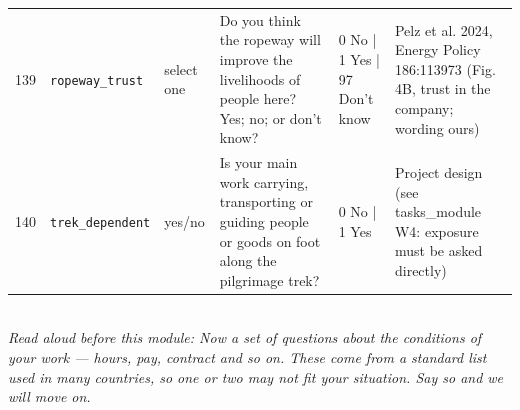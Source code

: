 \documentclass[9pt,a4paper,landscape]{article}
\begin{document}
\begin{longtable}{@{}p{0.5cm}p{3.3cm}p{1.7cm}p{7.3cm}p{5.6cm}p{5.4cm}@{}}
\footnotesize 139 & \footnotesize\texttt{ropeway\_trust} & \scriptsize select one & \footnotesize Do you think the ropeway will improve the livelihoods of people here? Yes; no; or don't know?\par\vspace{1pt}{\footnotesize\color{hdr}{\hifont क्या आपको लगता है कि रोपवे से यहाँ के लोगों की रोज़ी-रोटी सुधरेगी? हाँ; नहीं; या पता नहीं?}} & \scriptsize 0 No | 1 Yes | 97 Don't know & \scriptsize Pelz et al. 2024, Energy Policy 186:113973 (Fig. 4B, trust in the company; wording ours)\\
\footnotesize 140 & \footnotesize\texttt{trek\_dependent} & \scriptsize yes/no & \footnotesize Is your main work carrying, transporting or guiding people or goods on foot along the pilgrimage trek?\par\vspace{1pt}{\footnotesize\color{hdr}{\hifont क्या आपका मुख्य यात्रा-काम गौरीकुंड से केदारनाथ के पैदल रास्ते पर लोगों या सामान को ले जाना, पहुँचाना या रास्ता दिखाना है?}} & \scriptsize 0 No | 1 Yes & \scriptsize Project design (see tasks\_module W4: exposure must be asked directly)\\
\bottomrule\end{longtable}\vspace{6pt}
\\[3pt]
{\small\itshape Read aloud before this module: Now a set of questions about the conditions of your work — hours, pay, contract and so on. These come from a standard list used in many countries, so one or two may not fit your situation. Say so and we will move on.}\\[5pt]
\end{document}
